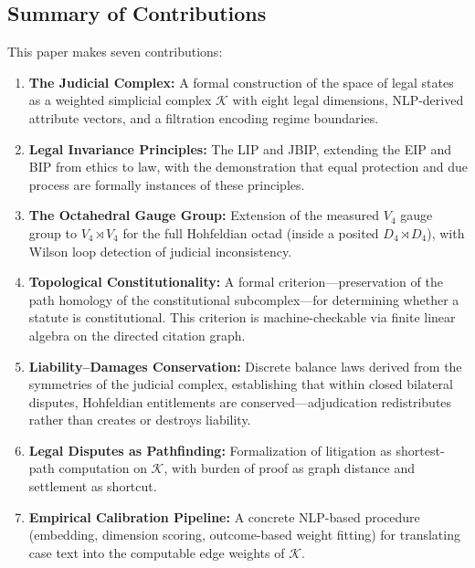 \documentclass[12pt]{article}
\theoremstyle{definition}
\theoremstyle{remark}
\begin{document}
\subsection{Summary of Contributions}

This paper makes seven contributions:

\begin{enumerate}
    \item \textbf{The Judicial Complex:} A formal construction of the space of legal states as a weighted simplicial complex $\mathcal{K}$ with eight legal dimensions, NLP-derived attribute vectors, and a filtration encoding regime boundaries.

    \item \textbf{Legal Invariance Principles:} The LIP and JBIP, extending the EIP and BIP from ethics to law, with the demonstration that equal protection and due process are formally instances of these principles.

    \item \textbf{The Octahedral Gauge Group:} Extension of the measured $V_4$ gauge group to $V_4 \rtimes V_4$ for the full Hohfeldian octad (inside a posited $D_4 \rtimes D_4$), with Wilson loop detection of judicial inconsistency.

    \item \textbf{Topological Constitutionality:} A formal criterion---preservation of the path homology of the constitutional subcomplex---for determining whether a statute is constitutional.  This criterion is machine-checkable via finite linear algebra on the directed citation graph.

    \item \textbf{Liability--Damages Conservation:} Discrete balance laws derived from the symmetries of the judicial complex, establishing that within closed bilateral disputes, Hohfeldian entitlements are conserved---adjudication redistributes rather than creates or destroys liability.

    \item \textbf{Legal Disputes as Pathfinding:} Formalization of litigation as shortest-path computation on $\mathcal{K}$, with burden of proof as graph distance and settlement as shortcut.

    \item \textbf{Empirical Calibration Pipeline:} A concrete NLP-based procedure (embedding, dimension scoring, outcome-based weight fitting) for translating case text into the computable edge weights of $\mathcal{K}$.
\end{enumerate}
\end{document}
